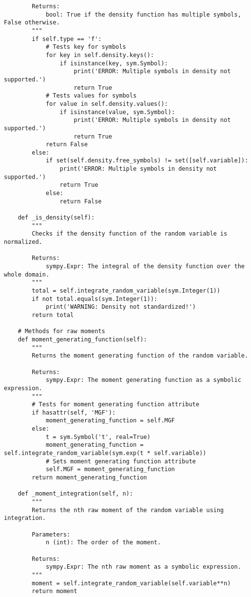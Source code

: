 \begin{small}
\begin{lstlisting}
        Returns:
            bool: True if the density function has multiple symbols, False otherwise.
        """
        if self.type == 'f':
            # Tests key for symbols
            for key in self.density.keys():
                if isinstance(key, sym.Symbol):
                    print('ERROR: Multiple symbols in density not supported.')
                    return True
            # Tests values for symbols
            for value in self.density.values():
                if isinstance(value, sym.Symbol):
                    print('ERROR: Multiple symbols in density not supported.')
                    return True
            return False
        else:
            if set(self.density.free_symbols) != set([self.variable]):
                print('ERROR: Multiple symbols in density not supported.')
                return True
            else:
                return False

    def _is_density(self):
        """
        Checks if the density function of the random variable is normalized.

        Returns:
            sympy.Expr: The integral of the density function over the whole domain.
        """
        total = self.integrate_random_variable(sym.Integer(1))
        if not total.equals(sym.Integer(1)):
            print('WARNING: Density not standardized!')
        return total

    # Methods for raw moments
    def moment_generating_function(self):
        """
        Returns the moment generating function of the random variable.

        Returns:
            sympy.Expr: The moment generating function as a symbolic expression.
        """
        # Tests for moment generating function attribute
        if hasattr(self, 'MGF'):
            moment_generating_function = self.MGF
        else:
            t = sym.Symbol('t', real=True)
            moment_generating_function = self.integrate_random_variable(sym.exp(t * self.variable))
            # Sets moment generating function attribute
            self.MGF = moment_generating_function
        return moment_generating_function

    def _moment_integration(self, n):
        """
        Returns the nth raw moment of the random variable using integration.

        Parameters:
            n (int): The order of the moment.

        Returns:
            sympy.Expr: The nth raw moment as a symbolic expression.
        """
        moment = self.integrate_random_variable(self.variable**n)
        return moment


\end{lstlisting}
\end{small}
